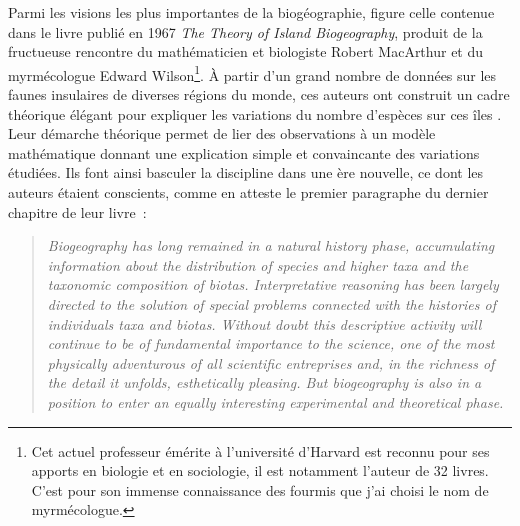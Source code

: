 Parmi les visions les plus importantes de la biogéographie, figure celle
contenue dans le livre publié en 1967 \emph{The Theory of Island
Biogeography}, produit de la fructueuse rencontre du mathématicien et
biologiste Robert MacArthur et du myrmécologue Edward Wilson\footnote{Cet
  actuel professeur émérite à l'université d'Harvard est reconnu pour
  ses apports en biologie et en sociologie, il est notamment l'auteur de
  32 livres. C'est pour son immense connaissance des fourmis que j'ai
  choisi le nom de myrmécologue.}. À partir d'un grand nombre de données
sur les faunes insulaires de diverses régions du monde, ces auteurs ont
construit un cadre théorique élégant pour expliquer les variations du
nombre d'espèces sur ces îles \citep{MacArthur1967}. Leur démarche
théorique permet de lier des observations à un modèle mathématique
donnant une explication simple et convaincante des variations étudiées.
Ils font ainsi basculer la discipline dans une ère nouvelle, ce dont les
auteurs étaient conscients, comme en atteste le premier paragraphe du
dernier chapitre de leur livre~:

\begin{quote}
\emph{Biogeography has long remained in a natural history phase,
accumulating information about the distribution of species and higher
taxa and the taxonomic composition of biotas. Interpretative reasoning
has been largely directed to the solution of special problems connected
with the histories of individuals taxa and biotas. Without doubt this
descriptive activity will continue to be of fundamental importance to
the science, one of the most physically adventurous of all scientific
entreprises and, in the richness of the detail it unfolds, esthetically
pleasing. But biogeography is also in a position to enter an equally
interesting experimental and theoretical phase.}
\end{quote}

